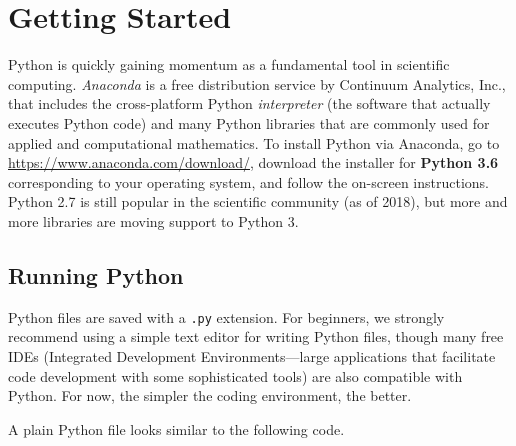 \label{lab:Python_Intro}

\section*{Getting Started} %

Python is quickly gaining momentum as a fundamental tool in scientific computing.
\emph{Anaconda} is a free distribution service by Continuum Analytics, Inc., that includes the cross-platform Python \emph{interpreter} (the software that actually executes Python code) and many Python libraries that are commonly used for applied and computational mathematics.
To install Python via Anaconda, go to \url{https://www.anaconda.com/download/}, download the installer for \textbf{Python 3.6} corresponding to your operating system, and follow the on-screen instructions.
Python 2.7 is still popular in the scientific community (as of 2018), but more and more libraries are moving support to Python 3.

\subsection*{Running Python} %

Python files are saved with a \texttt{.py} extension.
For beginners, we strongly recommend using a simple text editor for writing Python files, though many free IDEs (Integrated Development Environments---large applications that facilitate code development with some sophisticated tools) are also compatible with Python.
For now, the simpler the coding environment, the better.

A plain Python file looks similar to the following code.

